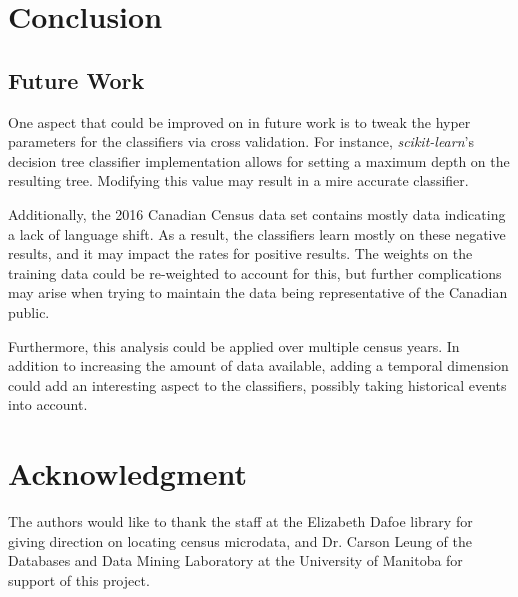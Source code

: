 \documentclass[10pt, conference, compsocconf]{IEEEtran}
\begin{document}
\section{Conclusion}


\subsection{Future Work}
One aspect that could be improved on in future work is to tweak the hyper parameters for the classifiers via cross validation. For instance, \textit{scikit-learn}'s decision tree classifier implementation allows for setting a maximum depth on the resulting tree. Modifying this value may result in a mire accurate classifier.

Additionally, the 2016 Canadian Census data set contains mostly data indicating a lack of language shift. As a result, the classifiers learn mostly on these negative results, and it may impact the rates for positive results. The weights on the training data could be re-weighted to account for this, but further complications may arise when trying to maintain the data being representative of the Canadian public.

Furthermore, this analysis could be applied over multiple census years. In addition to increasing the amount of data available, adding a temporal dimension could add an interesting aspect to the classifiers, possibly taking historical events into account. 

\section*{Acknowledgment}


The authors would like to thank the staff at the Elizabeth Dafoe library for giving direction on locating census microdata, and Dr. Carson Leung of the Databases and Data Mining Laboratory at the University of Manitoba for support of this project.



\end{document}
